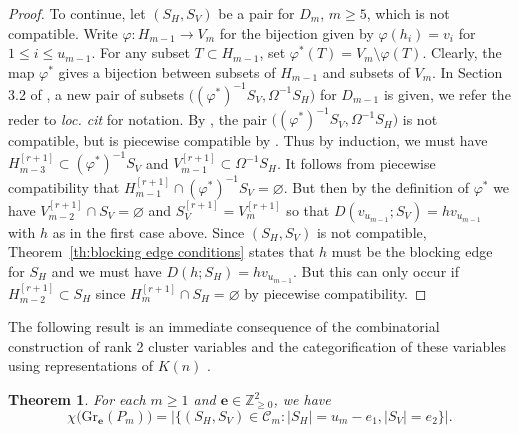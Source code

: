 \documentclass{amsart}
\newtheorem{theorem}{Theorem}[section]
\numberwithin{equation}{section}
\newcommand{\ZZ}{\mathbb{Z}}
\newcommand{\bfe}{\mathbf{e}}
\newcommand{\cC}{\mathcal{C}}
\newcommand{\Gr}{\mathrm{Gr}}
\begin{document}
\begin{proof}
  To continue, let $(S_H,S_V)$ be a pair for $D_m$, $m\ge5$, which is not compatible.
  Write $\varphi:H_{m-1}\to V_m$ for the bijection given by $\varphi(h_i)=v_i$ for $1\le i\le u_{m-1}$.
  For any subset $T\subset H_{m-1}$, set $\varphi^*(T)=V_m\setminus\varphi(T)$.
  Clearly, the map $\varphi^*$ gives a bijection between subsets of $H_{m-1}$ and subsets of $V_m$.
  In Section 3.2 of \cite{rupel}, a new pair of subsets $\big((\varphi^*)^{-1}S_V,\Omega^{-1}S_H\big)$ for $D_{m-1}$ is given, we refer the reder to \emph{loc. cit} for notation.
  By \cite[Proposition 3.10]{rupel}, the pair $\big((\varphi^*)^{-1}S_V,\Omega^{-1}S_H\big)$ is not compatible, but is piecewise compatible by \cite[proposition 3.16]{rupel}.
  Thus by induction, we must have $H_{m-3}^{[r+1]}\subset(\varphi^*)^{-1}S_V$ and $V_{m-1}^{[r+1]}\subset\Omega^{-1}S_H$.
  It follows from piecewise compatibility that $H_{m-1}^{[r+1]}\cap(\varphi^*)^{-1}S_V=\varnothing$.
  But then by the definition of $\varphi^*$ we have $V_{m-2}^{[r+1]}\cap S_V=\varnothing$ and $S_V^{[r+1]}=V_m^{[r+1]}$ so that $D(v_{u_{m-1}};S_V)=hv_{u_{m-1}}$ with $h$ as in the first case above.
  Since $(S_H,S_V)$ is not compatible, Theorem~\ref{th:blocking edge conditions} states that $h$ must be the blocking edge for $S_H$ and we must have $D(h;S_H)=hv_{u_{m-1}}$.
  But this can only occur if $H_{m-2}^{[r+1]}\subset S_H$ since $H_m^{[r+1]}\cap S_H=\varnothing$ by piecewise compatibility.
\end{proof}

The following result is an immediate consequence of the combinatorial construction of rank 2 cluster variables \cite{llz} and the categorification of these variables using representations of $K(n)$ \cite{cc,ck}.
\begin{theorem}
  \label{th:combinatorial euler}
  \cite{llz}
  For each $m\ge1$ and $\bfe\in\ZZ_{\ge0}^2$, we have 
  \[\chi\big(\Gr_\bfe(P_m)\big)=\big|\{(S_H,S_V)\in\cC_m:|S_H|=u_m-e_1,|S_V|=e_2\}\big|.\]
\end{theorem}
\end{document}
